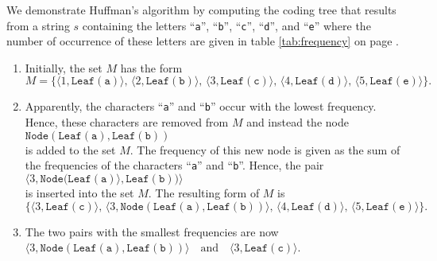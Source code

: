 We demonstrate Huffman's algorithm by computing  the coding tree that results from a string $s$ containing the
letters ``\texttt{a}'', ``\texttt{b}'', ``\texttt{c}'', ``\texttt{d}'', and ``\texttt{e}'' where the number of
occurrence of these letters are given in table \ref{tab:frequency} on page \pageref{tab:frequency}.
\begin{enumerate}
\item Initially, the set $M$ has the form
      \\[0.2cm]
      \hspace*{0.3cm}
      $ M = \bigl\{ \langle 1, \texttt{Leaf}(\texttt{a}) \rangle,\,
             \langle 2, \texttt{Leaf}(\texttt{b}) \rangle,\, 
             \langle 3, \texttt{Leaf}(\texttt{c}) \rangle,\,
             \langle 4, \texttt{Leaf}(\texttt{d}) \rangle,\,
             \langle 5, \texttt{Leaf}(\texttt{e}) \rangle\bigr\}. $
\item Apparently, the characters ``\texttt{a}'' and ``\texttt{b}'' occur with the lowest frequency.  Hence,
  these characters are removed from $M$ and instead the node 
      \\[0.2cm]
      \hspace*{0.3cm}
      $\texttt{Node}(\texttt{Leaf}(\texttt{a}), \texttt{Leaf}(\texttt{b}))$
      \\[0.2cm]
      is added to the set $M$.  The frequency of this new node is given as the sum of the frequencies of the
      characters ``\texttt{a}'' and ``\texttt{b}''.   Hence, the pair 
      \\[0.2cm]
      \hspace*{0.3cm}
      $\langle 3, \texttt{Node}\bigl(\texttt{Leaf}(\texttt{a}) \rangle, \texttt{Leaf}(\texttt{b}) \bigr) \rangle$
      \\[0.2cm]
      is inserted into the set  $M$.  The resulting form of $M$ is
      \\[0.2cm]
      \hspace*{0.3cm}
      $ \bigl\{\langle 3, \texttt{Leaf}(\texttt{c}) \rangle,\,
			\langle 3, \texttt{Node}(\texttt{Leaf}(\texttt{a}), \texttt{Leaf}(\texttt{b}))\rangle,\,
              \langle 4, \texttt{Leaf}(\texttt{d}) \rangle,\,
             \langle 5, \texttt{Leaf}(\texttt{e}) \rangle\bigr\}. $
\item The two pairs with the smallest frequencies are now
      \\[0.2cm]
      \hspace*{0.3cm}
      $ \langle 3, \texttt{Node}(\texttt{Leaf}(\texttt{a}), \texttt{Leaf}(\texttt{b})) \rangle \quad \mathrm{and} \quad \langle 3, \texttt{Leaf}(\texttt{c})\rangle$.

\end{enumerate}
